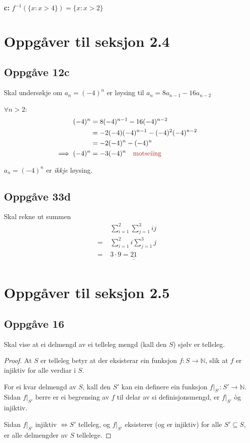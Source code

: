 \documentclass[a4paper, 11pt]{article}
\newcommand{\deloppg}[1]{\vspace{1mm}\noindent \textbf{\themecolor{#1:}}}
\newcommand{\themeshade}{Mahogany}
\newcommand{\themecolor}[1]{\textcolor{\themeshade}{#1}}
\def\dul#1{\underline{\underline{#1}}}
\begin{document}
\vspace{3mm}
\deloppg{c} \(f^{-1}(\{x: x > 4\}) = \{x : x > 2\}\)

\section{Oppgåver til seksjon 2.4} %

\subsection*{Oppgåve 12c}
Skal undersøkje om \(a_n = (-4)^n\) er løysing til \(a_n = 8a_{n-1} - 16a_{n-2}\)

\noindent \(\forall n > 2\):
\begin{align*}
    (-4)^n &= 8(-4)^{n-1} - 16(-4)^{n-2} \\
    &= -2(-4)(-4)^{n-1} - (-4)^2(-4)^{n-2} \\
    &= -2(-4)^n - (-4)^n \\
    \implies (-4)^n &= -3(-4)^n \quad \text{\themecolor{motseiing}}
\end{align*}

\noindent \(a_n = (-4)^n\) er {\em ikkje} løysing.


\subsection*{Oppgåve 33d}
Skal rekne ut summen
\begin{align*}
    &\sum_{i=1}^2\sum_{j=1}^3 ij \\
    =\;&\sum_{i=1}^2i\sum_{j=1}^3j \\
    =\;&3 \cdot 9 = \dul{21}\\
\end{align*}

\newpage
\section{Oppgåver til seksjon 2.5} %
\subsection*{Oppgåve 16}
Skal vise at ei delmengd av ei telleleg mengd (kall den \(S\)) sjølv er telleleg.

\begin{proof}
    At \(S\) er telleleg betyr at der eksisterar ein funksjon \(f: S \rightarrow \mathbb{N}\), slik at \(f\)
    er injiktiv for alle verdiar i \(S\).

    For ei kvar delmengd av \(S\), kall den \(S'\) kan ein definere ein 
    funksjon \(f|_{S'}: S' \rightarrow \mathbb{N}\). Sidan \(f|_{S'}\) berre er ei begrensing av \(f\) til
    delar av si definisjonsmengd, er \(f|_{S'}\) òg injiktiv.

    \vspace{3mm}\noindent
    Sidan \(f|_{S'}\) injiktiv \(\iff S'\) telleleg, og \(f|_{S'}\) eksisterer (og er injiktiv) for alle \(S' \subseteq S\), er
    alle delmengder av \(S\) tellelege.
\end{proof}
\end{document}
